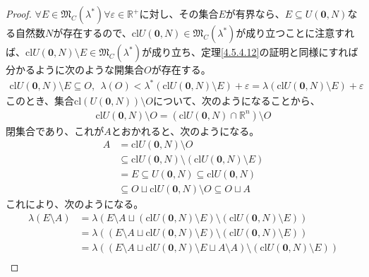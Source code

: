 \documentclass[dvipdfmx]{jsarticle}
\begin{document}
\begin{proof}
$\forall E \in \mathfrak{M}_{C}\left( \lambda^{*} \right)\forall\varepsilon \in \mathbb{R}^{+}$に対し、その集合$E$が有界なら、$E \subseteq U\left( \mathbf{0},N \right)$なる自然数$N$が存在するので、$\mathrm{cl}{U\left( \mathbf{0},N \right)} \in \mathfrak{M}_{C}\left( \lambda^{*} \right)$が成り立つことに注意すれば、$\mathrm{cl}{U\left( \mathbf{0},N \right)} \setminus E \in \mathfrak{M}_{C}\left( \lambda^{*} \right)$が成り立ち、定理\ref{4.5.4.12}の証明と同様にすれば分かるように次のような開集合$O$が存在する。
\begin{align*}
\mathrm{cl}{U\left( \mathbf{0},N \right)} \setminus E \subseteq O,\ \ \lambda(O) < \lambda^{*}\left( \mathrm{cl}{U\left( \mathbf{0},N \right)} \setminus E \right) + \varepsilon = \lambda\left( \mathrm{cl}{U\left( \mathbf{0},N \right)} \setminus E \right) + \varepsilon
\end{align*}
このとき、集合$\mathrm{cl}\left( U\left( \mathbf{0},N \right) \right) \setminus O$について、次のようになることから、
\begin{align*}
\mathrm{cl}{U\left( \mathbf{0},N \right)} \setminus O = \left( \mathrm{cl}{U\left( \mathbf{0},N \right)} \cap \mathbb{R}^{n} \right) \setminus O
\end{align*}
閉集合であり、これが$A$とおかれると、次のようになる。
\begin{align*}
A &= \mathrm{cl}{U\left( \mathbf{0},N \right)} \setminus O\\
&\subseteq \mathrm{cl}{U\left( \mathbf{0},N \right)} \setminus \left( \mathrm{cl}{U\left( \mathbf{0},N \right)} \setminus E \right)\\
&= E \subseteq U\left( \mathbf{0},N \right) \subseteq \mathrm{cl}{U\left( \mathbf{0},N \right)}\\
&\subseteq O \sqcup \mathrm{cl}{U\left( \mathbf{0},N \right)} \setminus O \subseteq O \sqcup A
\end{align*}
これにより、次のようになる。
\begin{align*}
\lambda(E \setminus A) &= \lambda\left( E \setminus A \sqcup \left( \mathrm{cl}{U\left( \mathbf{0},N \right)} \setminus E \right) \setminus \left( \mathrm{cl}{U\left( \mathbf{0},N \right)} \setminus E \right) \right)\\
&= \lambda\left( \left( E \setminus A \sqcup \mathrm{cl}{U\left( \mathbf{0},N \right)} \setminus E \right) \setminus \left( \mathrm{cl}{U\left( \mathbf{0},N \right)} \setminus E \right) \right)\\
&= \lambda\left( \left( E \setminus A \sqcup \mathrm{cl}{U\left( \mathbf{0},N \right)} \setminus E \sqcup A \setminus A \right) \setminus \left( \mathrm{cl}{U\left( \mathbf{0},N \right)} \setminus E \right) \right)\\

\end{align*}
\end{proof}
\end{document}
